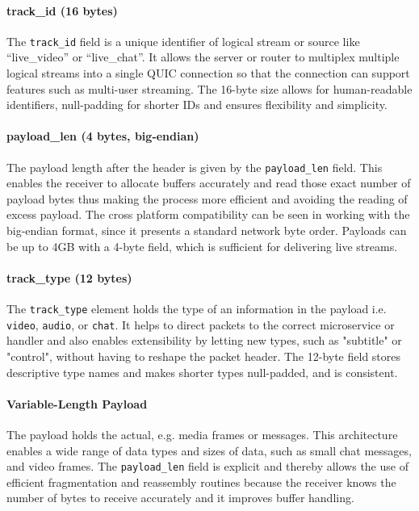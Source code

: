 \paragraph{track\_id (16 bytes)}
The \texttt{track\_id} field is a unique identifier of logical stream or source like ``live\_video'' or ``live\_chat''. It allows the server or router to multiplex multiple logical streams into a single QUIC connection so that the connection can support features such as multi-user streaming. The 16-byte size allows for human-readable identifiers, null-padding for shorter IDs and ensures flexibility and simplicity.

\paragraph{payload\_len (4 bytes, big-endian)}
The payload length after the header is given by the \texttt{payload\_len} field. This enables the receiver to allocate buffers accurately and read those exact number of payload bytes thus making the process more efficient and avoiding the reading of excess payload. The cross platform compatibility can be seen in working with the big-endian format, since it presents a standard network byte order. Payloads can be up to 4GB with a 4-byte field, which is sufficient for delivering live streams.

\paragraph{track\_type (12 bytes)}
The \texttt{track\_type} element holds the type of an information in the payload i.e. \texttt{video}, \texttt{audio}, or \texttt{chat}. It helps to direct packets to the correct microservice or handler and also enables extensibility by letting new types, such as "subtitle" or "control", without having to reshape the packet header. The 12-byte field stores descriptive type names and makes shorter types null-padded, and is consistent.

\paragraph{Variable-Length Payload}
The payload holds the actual, e.g. media frames or messages. This architecture enables a wide range of data types and sizes of data, such as small chat messages, and video frames. The \texttt{payload\_len} field is explicit and thereby allows the use of efficient fragmentation and reassembly routines because the receiver knows the number of bytes to receive accurately and it improves buffer handling.


